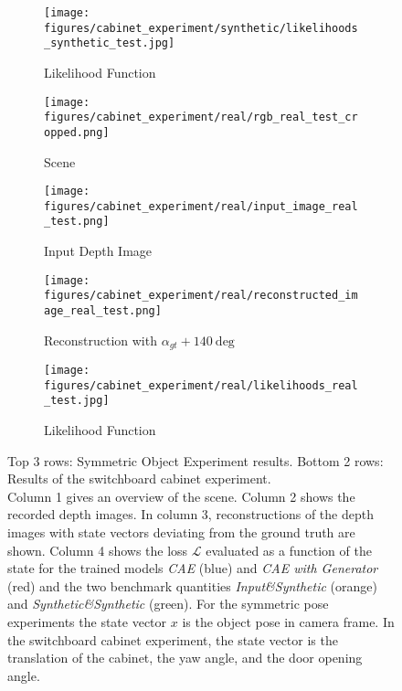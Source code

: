 \documentclass[letterpaper, 10 pt, journal, twoside]{ieeetran}  %
\begin{document}
\begin{figure*}[htp]
\begin{subfigure}[t]{0.245\textwidth}
		\texttt{[image: figures/cabinet\_experiment/synthetic/likelihoods\_synthetic\_test.jpg]}
		\caption{Likelihood Function}
		\label{fig:cabinet_exp_synthetic_conditional_likelihoods}
	\end{subfigure}
	\hfill
	\begin{subfigure}[t]{0.245\textwidth}
		\texttt{[image: figures/cabinet\_experiment/real/rgb\_real\_test\_cropped.png]}
		\caption{Scene}
		\label{fig:cabinet_exp_real_scene}
	\end{subfigure}
	\hfill
	\begin{subfigure}[t]{0.245\textwidth}
		\texttt{[image: figures/cabinet\_experiment/real/input\_image\_real\_test.png]}
		\caption{Input Depth Image}
		\label{fig:cabinet_exp_real_input_image}
	\end{subfigure}
	\hfill
	\begin{subfigure}[t]{0.245\textwidth}
		\texttt{[image: figures/cabinet\_experiment/real/reconstructed\_image\_real\_test.png]}
		\caption{Reconstruction with $\alpha_{gt} + 140 \ \textrm{deg}$}
		\label{fig:cabinet_exp_real_reconstruction}
	\end{subfigure}
	\hfill
	\begin{subfigure}[t]{0.245\textwidth}
		\texttt{[image: figures/cabinet\_experiment/real/likelihoods\_real\_test.jpg]}
		\caption{Likelihood Function}
		\label{fig:cabinet_exp_real_conditional_likelihoods}
	\end{subfigure}
	\caption{
	Top 3 rows: Symmetric Object Experiment results. Bottom 2 rows: Results of the switchboard cabinet experiment.\\
	Column 1 gives an overview of the scene. Column 2 shows the recorded depth images. In column 3, reconstructions of the depth images with state vectors deviating from the ground truth are shown. Column 4 shows the loss $\mathcal{L}$ evaluated as a function of the state for the trained models \textit{CAE} (blue) and \textit{CAE with Generator} (red) and the two benchmark quantities \textit{Input\&Synthetic} (orange) and \textit{Synthetic\&Synthetic} (green).
	For the symmetric pose experiments the state vector $x$ is the object pose in camera frame.
	In the switchboard cabinet experiment, the state vector is the translation of the cabinet, the yaw angle, and the door opening angle.}
	\label{fig:likelihood_plots}
\end{figure*}
\end{document}
